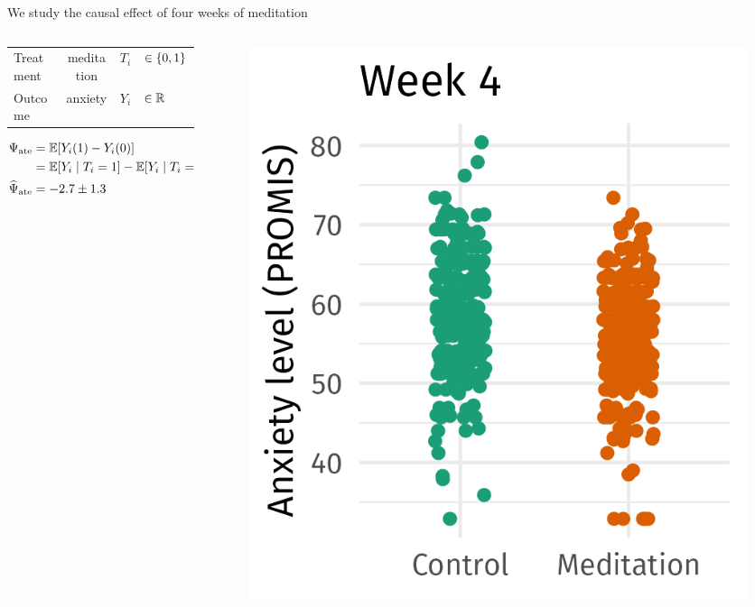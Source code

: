 \documentclass[aspectratio=169]{beamer}
\theoremstyle{remark}
\begin{document}
\begin{frame}{We study the causal effect of four weeks of meditation}
\begin{columns}
\begin{column}{0.6 \textwidth}
            \begin{table}[]
                \begin{tabular}{lcrl}
                    Treatment & meditation & $T_i$ & $\in \{0, 1\} $ \\
                    Outcome   & anxiety    & $Y_i$ & $\in \mathbb{R}$
                \end{tabular}
            \end{table}
            \begin{align*}
                \ate    & = \E{Y_i (1) - Y_i (0)}                       \\
                        & = \E{Y_i \mid T_i = 1} - \E{Y_i \mid T_i = 0} \\
                \atehat & = -2.7 \pm 1.3
            \end{align*}
        \end{column}
        \begin{column}{0.4 \textwidth}
            \centering
            \begin{figure}[ht]
                \includegraphics{figures/week4_scatter.png}
                \centering
            \end{figure}
        \end{column}
    \end{columns}
\end{frame}
\end{document}
